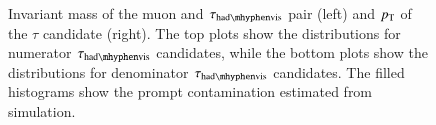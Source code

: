 \begin{figure}[htbp]
{	}
	\hfill
\caption{\label{fig:taufakeprompt} Invariant mass of the muon and $\tauhadvis$ pair (left) and
  $p_{\text{T}}$ of the $\tau$ candidate (right). The top plots show the distributions for numerator $\tauhadvis$ candidates, while the bottom plots show the distributions for denominator $\tauhadvis$ candidates. The filled histograms show the prompt contamination estimated from simulation.}
\end{figure}

